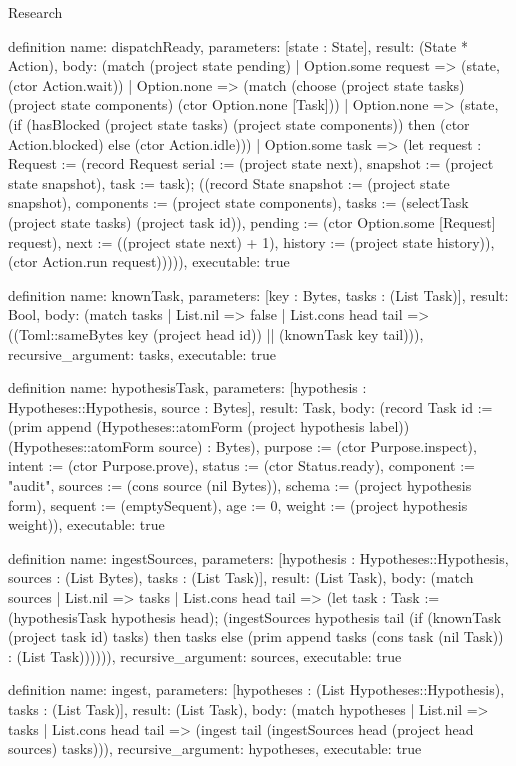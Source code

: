 \begin{lexlean}{Research}
\begin{semanticmodule}
definition{
  name: dispatchReady,
  parameters: [state : State],
  result: (State * Action),
  body: (match (project state pending)
    | Option.some request => (state, (ctor Action.wait))
    | Option.none => (match (choose (project state tasks) (project state components) (ctor Option.none [Task]))
      | Option.none => (state, (if (hasBlocked (project state tasks) (project state components)) then (ctor Action.blocked) else (ctor Action.idle)))
      | Option.some task => (let request : Request := (record Request {serial := (project state next), snapshot := (project state snapshot), task := task}); ((record State {snapshot := (project state snapshot), components := (project state components), tasks := (selectTask (project state tasks) (project task id)), pending := (ctor Option.some [Request] request), next := ((project state next) + 1), history := (project state history)}), (ctor Action.run request))))),
  executable: true
}

definition{
  name: knownTask,
  parameters: [key : Bytes, tasks : (List Task)],
  result: Bool,
  body: (match tasks
    | List.nil => false
    | List.cons head tail => ((Toml::sameBytes key (project head id)) || (knownTask key tail))),
  recursive_argument: tasks,
  executable: true
}

definition{
  name: hypothesisTask,
  parameters: [hypothesis : Hypotheses::Hypothesis, source : Bytes],
  result: Task,
  body: (record Task {id := (prim append (Hypotheses::atomForm (project hypothesis label)) (Hypotheses::atomForm source) : Bytes), purpose := (ctor Purpose.inspect), intent := (ctor Purpose.prove), status := (ctor Status.ready), component := "audit", sources := (cons source (nil Bytes)), schema := (project hypothesis form), sequent := (emptySequent), age := 0, weight := (project hypothesis weight)}),
  executable: true
}

definition{
  name: ingestSources,
  parameters: [hypothesis : Hypotheses::Hypothesis, sources : (List Bytes), tasks : (List Task)],
  result: (List Task),
  body: (match sources
    | List.nil => tasks
    | List.cons head tail => (let task : Task := (hypothesisTask hypothesis head); (ingestSources hypothesis tail (if (knownTask (project task id) tasks) then tasks else (prim append tasks (cons task (nil Task)) : (List Task)))))),
  recursive_argument: sources,
  executable: true
}

definition{
  name: ingest,
  parameters: [hypotheses : (List Hypotheses::Hypothesis), tasks : (List Task)],
  result: (List Task),
  body: (match hypotheses
    | List.nil => tasks
    | List.cons head tail => (ingest tail (ingestSources head (project head sources) tasks))),
  recursive_argument: hypotheses,
  executable: true
}


\end{semanticmodule}
\end{lexlean}
